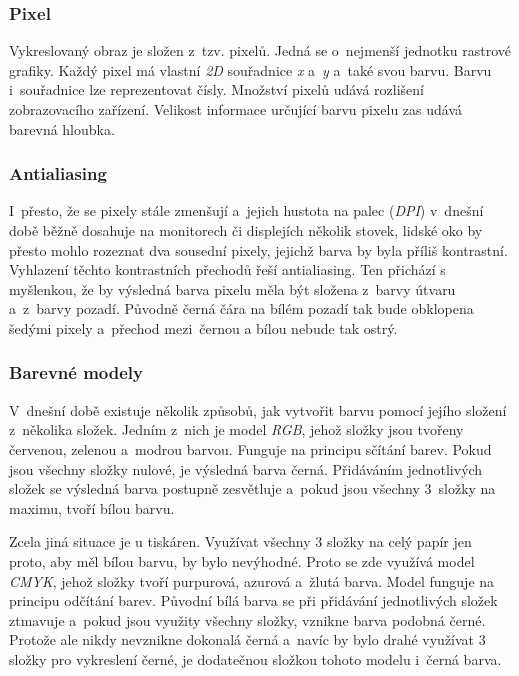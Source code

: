 \documentclass[a4paper,12pt]{article}
\begin{document}
\subsubsection{Pixel}

Vykreslovaný obraz je složen z~tzv. pixelů. Jedná se o~nejmenší jednotku rastrové grafiky. Každý pixel má vlastní \textit{2D} souřadnice \textit{x} a~\textit{y} a~také svou barvu. Barvu i~souřadnice lze reprezentovat čísly. Množství pixelů udává rozlišení zobrazovacího zařízení. Velikost informace určující barvu pixelu zas udává barevná hloubka.~\cite{graphic}

\subsubsection{Antialiasing}

I~přesto, že se pixely stále zmenšují a~jejich hustota na palec (\textit{DPI}) v~dnešní době běžně dosahuje na monitorech či displejích několik stovek, lidské oko by přesto mohlo rozeznat dva sousední pixely, jejichž barva by byla příliš kontrastní. Vyhlazení těchto kontrastních přechodů řeší antialiasing. Ten přichází s myšlenkou, že by výsledná barva pixelu měla být složena z~barvy útvaru a~z~barvy pozadí. Původně černá čára na bílém pozadí tak bude obklopena šedými pixely a~přechod mezi~černou a bílou nebude tak ostrý.~\cite{graphic}

\subsubsection{Barevné modely}

V~dnešní době existuje několik způsobů, jak vytvořit barvu pomocí jejího složení z~několika složek. Jedním z~nich je model \textit{RGB}, jehož složky jsou tvořeny červenou, zelenou a~modrou barvou. Funguje na principu sčítání barev. Pokud jsou všechny složky nulové, je výsledná barva černá. Přidáváním jednotlivých složek se výsledná barva postupně zesvětluje a~pokud jsou všechny 3~složky na maximu, tvoří bílou barvu.~\cite{graphic}

Zcela jiná situace je u tiskáren. Využívat všechny 3 složky na celý papír jen proto, aby měl bílou barvu, by bylo nevýhodné. Proto se zde využívá model \textit{CMYK}, jehož složky tvoří purpurová, azurová a~žlutá barva. Model funguje na principu odčítání barev. Původní bílá barva se při přidávání jednotlivých složek ztmavuje a~pokud jsou využity všechny složky, vznikne barva podobná černé. Protože ale nikdy nevznikne dokonalá černá a~navíc by bylo drahé využívat 3 složky pro vykreslení černé, je dodatečnou složkou tohoto modelu i~černá barva.~\cite{graphic}
\end{document}
